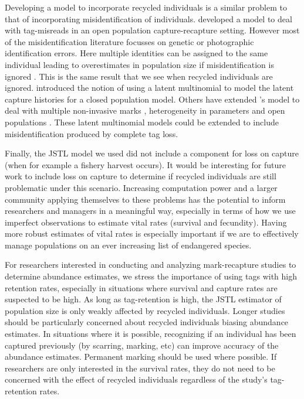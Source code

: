 \documentclass[12pt]{article}
\begin{document}
Developing a model to incorporate recycled individuals is a similar problem to that of incorporating misidentification of individuals.  \cite{Schwarz:1999} developed a model to deal with tag-misreads in an open population capture-recapture setting.  However most of the misidentification literature focusses on genetic or photographic identification errors.  Here multiple identities can be assigned to the same individual leading to overestimates in population size if misidentification is ignored \citep{Yoshizaki:2011}. This is the same result that we see when recycled individuals are ignored.   \cite{Link:2010} introduced the notion of using a latent multinomial to model the latent capture histories for a closed population model. Others have extended \citeauthor{Link:2010}'s model to deal with multiple non-invasive marks \citep{Bonner:2013, McClintock:2013}, heterogeneity in parameters \citep{Mcclintock:2014} and open populations \citep{Bonner:2013}.  These latent multinomial models could be extended to include misidentification produced by complete tag loss.

Finally, the JSTL model we used did not include a component for loss on capture (when for example a fishery harvest occurs).  It would be interesting for future work to include loss on capture to determine if recycled individuals are still problematic under this scenario.   Increasing computation power and a larger community applying themselves to these problems has the potential to inform researchers and managers in a meaningful way, especially in terms of how we use imperfect observations to estimate vital rates (survival and fecundity). Having more robust estimates of vital rates is especially important if we are to effectively manage populations on an ever increasing list of endangered species.

For researchers interested in conducting and analyzing mark-recapture
studies to determine abundance estimates, we stress the importance of using tags with high retention
rates, especially in situations where survival and capture rates are
suspected to be high. As long as tag-retention is high, the JSTL
estimator of population size is only weakly affected by recycled individuals. Longer studies should be particularly concerned about recycled individuals biasing abundance estimates.  In
situations where it is possible, recognizing if an individual has been
captured previously (by scarring, marking, etc) can improve accuracy of the
abundance estimates. Permanent marking should be used where possible. If
researchers are only interested in the survival rates, they do not need
to be concerned with the effect of recycled individuals regardless of
the study's tag-retention rates.
\end{document}

